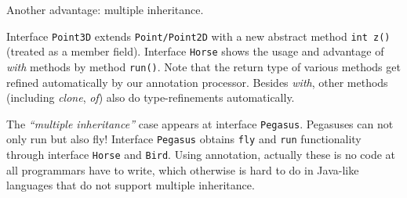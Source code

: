 Another advantage: multiple inheritance.







Interface \texttt{Point3D} extends \texttt{Point/Point2D} with a new abstract
method \texttt{int z()} (treated as a member field). Interface \texttt{Horse}
shows the usage and advantage of \emph{with} methods by method
\texttt{run()}. Note that the return type of various methods get refined
automatically by our annotation processor. Besides \emph{with}, other methods
(including \emph{clone}, \emph{of}) also do type-refinements automatically.

The \emph{``multiple inheritance''} case appears at interface
\texttt{Pegasus}. Pegasuses can not only run but also fly! Interface
\texttt{Pegasus} obtains \texttt{fly} and \texttt{run} functionality through
interface \texttt{Horse} and \texttt{Bird}. Using \mixin annotation, actually
these is no code at all programmars have to write, which otherwise is hard
to do in Java-like languages that do not support multiple inheritance.
